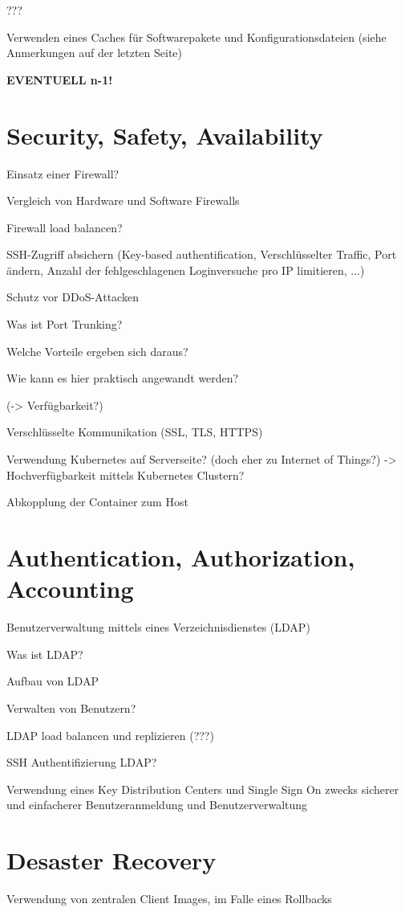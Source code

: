 ???

Verwenden eines Caches für Softwarepakete und Konfigurationsdateien (siehe Anmerkungen auf der letzten Seite)


\textbf{EVENTUELL n-1!}

\section{Security, Safety, Availability}
\label{sec:Security, Safety, Availability}
Einsatz einer Firewall?

Vergleich von Hardware und Software Firewalls

Firewall load balancen?

SSH-Zugriff absichern (Key-based authentification, Verschlüsselter Traffic, Port ändern, Anzahl der fehlgeschlagenen Loginversuche pro IP limitieren, ...)

Schutz vor DDoS-Attacken

Was ist Port Trunking?

Welche Vorteile ergeben sich daraus?

Wie kann es hier praktisch angewandt werden?

(-> Verfügbarkeit?)

Verschlüsselte Kommunikation (SSL, TLS, HTTPS)

Verwendung Kubernetes auf Serverseite? (doch eher zu Internet of Things?) -> Hochverfügbarkeit mittels Kubernetes Clustern?

Abkopplung der Container zum Host

\section{Authentication, Authorization, Accounting}
\label{sec:Authentication, Authorization, Accounting}
Benutzerverwaltung mittels eines Verzeichnisdienstes (LDAP)

Was ist LDAP?

Aufbau von LDAP

Verwalten von Benutzern?

LDAP load balancen und replizieren (???)

SSH Authentifizierung LDAP?

Verwendung eines Key Distribution Centers und Single Sign On zwecks sicherer und einfacherer Benutzeranmeldung und Benutzerverwaltung

\section{Desaster Recovery}
\label{sec:Desaster Recovery}
Verwendung von zentralen Client Images, im Falle eines Rollbacks

